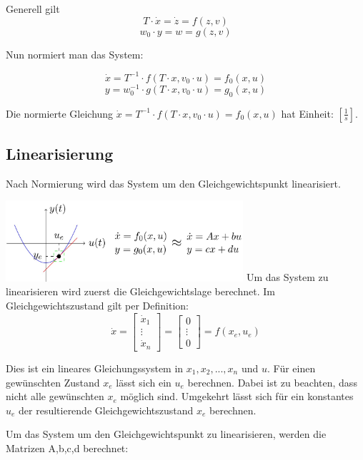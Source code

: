         Generell gilt
        \[T \cdot \dot{x} = \dot{z} = f(z,v) \]
        \[w_0 \cdot y = w = g(z,v)\]

\vfill\null\columnbreak
        Nun normiert man das System:
    
        \[ \dot{x} = T^{-1} \cdot f(T \cdot x, v_0 \cdot u) = f_0(x,u) \]
        \[ y = w_0^{-1} \cdot g(T \cdot x, v_0 \cdot u) = g_0(x,u)\]
   
        Die normierte Gleichung $\dot{x} = T^{-1} \cdot f(T \cdot x, v_0 \cdot u) = f_0(x,u)$ hat Einheit: $[\frac{1}{s}]$.
    
    \subsection{Linearisierung}
    
    Nach Normierung wird das System um den Gleichgewichtspunkt linearisiert. 
    
    \includegraphics[width=\linewidth, height=30mm]{images/01/01_linearisierung.jpg}
    Um das System zu linearisieren wird zuerst die Gleichgewichtslage berechnet. Im Gleichgewichtszustand gilt per Definition:
    \[ \dot{x} = \begin{bmatrix} \dot{x}_1 \\ \vdots \\ \dot{x}_n\end{bmatrix} = \begin{bmatrix} 0 \\ \vdots \\ 0 \end{bmatrix} = f(x_e,u_e)\]
    
    Dies ist ein lineares Gleichungssystem in $x_1,x_2,...,x_n$ und $u$. Für einen gewünschten Zustand $x_e$ lässt sich ein $u_e$ berechnen. Dabei ist zu beachten, dass nicht alle gewünschten $x_e$ möglich sind. Umgekehrt lässt sich für ein konstantes $u_e$ der resultierende Gleichgewichtszustand $x_e$ berechnen.
    
    Um das System um den Gleichgewichtspunkt zu linearisieren, werden die Matrizen A,b,c,d berechnet:
    
